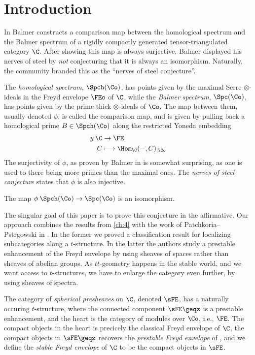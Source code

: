 
\section{Introduction}

In \cite{balmer_2019} Balmer constructs a comparison map between the homological spectrum and the Balmer spectrum of a rigidly compactly generated tensor-triangulated category $\C$. After showing this map is always surjective, Balmer displayed his nerves of steel by \emph{not} conjecturing that it is always an isomorphism. Naturally, the community branded this as the ``nerves of steel conjecture''. 

The \emph{homological spectrum}, $\Spch(\Co)$, has points given by the maximal Serre $\otimes$-ideals in the Freyd envelope $\FEo$ of $\C$, while the \emph{Balmer spectrum}, $\Spc(\Co)$, has points given by the prime thick $\otimes$-ideals of $\Co$. The map between them, usually denoted $\phi$, is called the comparison map, and is given by pulling back a homological prime $B\in \Spch(\Co)$ along the restricted Yoneda embedding 
\begin{align*}
    y\: \C &\to \FE \\
    C &\longmapsto \Hom_\C(-,C)_{\mid \Co}
\end{align*}
The surjectivity of $\phi$, as proven by Balmer in \cite[3.9]{balmer_2019} is somewhat surprising, as one is used to there being more primes than the maximal ones. The \emph{nerves of steel conjecture} states that $\phi$ is also injective. 

\begin{conjecture}
    \label{conj:nerves-of-steel}
    The map $\phi\: \Spch(\Co)\to \Spc(\Co)$ is an isomorphism. 
\end{conjecture}

The singular goal of this paper is to prove this conjecture in the affirmative. Our approach combines the results from \cref{ch:4} with the work of Patchkoria--Pstr\a{}gowski in \cite{patchkoria-pstragowski_2021}. In the former we proved a classification result for localizing subcategories along a $t$-structure. In the latter the authors study a prestable enhancement of the Freyd envelope by using sheaves of spaces rather than sheaves of abelian groups. As $tt$-geometry happens in the stable world, and we want access to $t$-structures, we have to enlarge the category even further, by using sheaves of spectra. 

The category of \emph{spherical presheaves} on $\C$, denoted $\sFE$, has a naturally occuring $t$-structure, where the connected component $\sFE\geqz$ is a prestable enhancement, and the heart is the category of modules over $\Co$, i.e., $\FE$. The compact objects in the heart is precicely the classical Freyd envelope of $\C$, the compact objects in $\sFE\geqz$ recovers the \emph{prestable Freyd envelope} of \cite{patchkoria-pstragowski_2021}, and we define the \emph{stable Freyd envelope} of $\C$ to be the compact objects in $\sFE$. 

